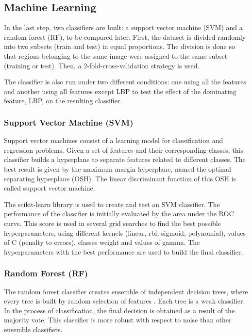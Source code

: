 \subsection{Machine Learning}
In the last step, two classifiers are built: a support vector machine (SVM) and a random forest (RF), to be compared later. First, the dataset is divided randomly into two subsets (train and test) in equal proportions. The division is done so that regions belonging to the same image were assigned to the same subset (training or test). Then, a 2-fold-cross-validation strategy is used.\par
The classifier is also run under two different conditions: one using all the features and another using all features except LBP to test the effect of the dominating feature, LBP, on the resulting classifier.\par

\subsubsection{Support Vector Machine (SVM)}
Support vector machines consist of a learning model for classification and regression problems. Given a set of features and their corresponding classes, this classifier builds a hyperplane to separate features related to different classes. The best result is given by the maximum margin hyperplane, named the optimal separating hyperplane (OSH). The linear discriminant function of this OSH is called support vector machine.\par
The scikit-learn library is used to create and test an SVM classifier. The performance of the classifier is initially evaluated by the area under the ROC curve. This score is used in several grid searches to find the best possible hyperparameters, using different kernels (linear, rbf, sigmoid, polynomial), values of C (penalty to errors), classes weight and values of gamma. The hyperparameters with the best performance are used to build the final classifier.\par

\subsubsection{Random Forest (RF)}
The random forest classifier creates ensemble of independent decision trees, where every tree is built by random selection of features \cite{Breiman2001}. Each tree is a weak classifier. In the process of classification, the final decision is obtained as a result of the majority vote. This classifier is more robust with respect to noise than other ensemble classifiers.


